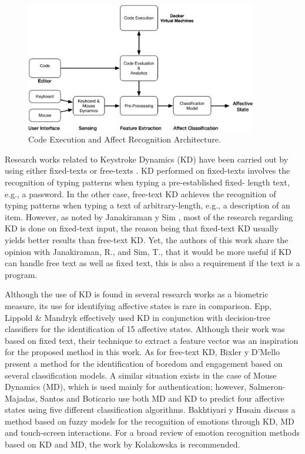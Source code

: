 \documentclass[a4paper,twoside]{article}
\begin{document}
\begin{figure}[h!tbp] 
\centering 
\includegraphics[width=0.9\textwidth]{KMDAffective.png} 
\caption{Code Execution and Affect Recognition Architecture.}
\label{fig_process} 
\end{figure}

Research works related to Keystroke Dynamics (KD) have been carried out by using either 
fixed-texts or free-texts \cite{gunetti2005keystroke}.
KD performed on fixed-texts
involves the recognition of typing patterns when typing a pre-established fixed-
length text, e.g., a password. In the other case, free-text KD achieves the
recognition of typing patterns when typing a text of arbitrary-length, e.g., a
description of an item. However, as noted by Janakiraman y Sim \cite{janakiraman2007keystroke},
most of
the research regarding KD is done on fixed-text input, the reason being that
fixed-text KD usually yields better results than free-text KD. Yet, the authors
of this work share the opinion with Janakiraman, R., and Sim, T., that it would
be more useful if KD can handle free text as well as fixed text, this is also a
requirement if the text is a program.

Although the use of KD is found in several research works
as a biometric measure, its use for identifying affective states is rare in
comparison. Epp, Lippold \& Mandryk \cite{epp2011identifying} effectively used KD in conjunction
with decision-tree classifiers for the identification of 15 affective states.
Although their work was based on fixed text, their technique to extract a feature
vector was an inspiration for the proposed method in this work. As for free-text
KD, Bixler y D'Mello \cite{bixler2013detecting} present a method for the identification of boredom
and engagement based on several classification models. A similar situation exists in the case of Mouse Dynamics (MD), which is used mainly for authentication; however, Salmeron-Majadas, Santos
and Boticario \cite{salmeron2014exploring} use both MD and KD to predict four affective states using
five different classification algorithms. Bakhtiyari y Husain \cite{bakhtiyari2014fuzzy} discuss a
method based on fuzzy models for the recognition of emotions through KD, MD and
touch-screen interactions. For a broad review of emotion recognition methods
based on KD and MD, the work by Kolakowska \cite{kolakowska2013review} is recommended.
\end{document}
